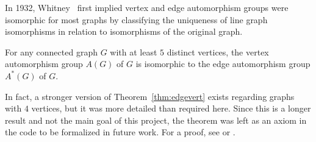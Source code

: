 \documentclass{article}
\begin{document}
In 1932, Whitney~\cite{whit} first implied vertex and edge automorphism groups were isomorphic for most graphs by classifying the uniqueness of line graph isomorphisms in relation to isomorphisms of the original graph. 
\begin{theorem}\label{thm:edgevert}
    For any connected graph $G$ with at least $5$ distinct vertices, the vertex automorphism group $A(G)$ of $G$ is isomorphic to the edge automorphism group $A^*(G)$ of $G.$
\end{theorem} 
In fact, a stronger version of Theorem~\ref{thm:edgevert} exists regarding graphs with $4$ vertices, but it was more detailed than required here. Since this is a longer result and not the main goal of this project, the theorem was left as an axiom in the code to be formalized in future work. For a proof, see \cite{whit} or \cite{intro}.
\end{document}
